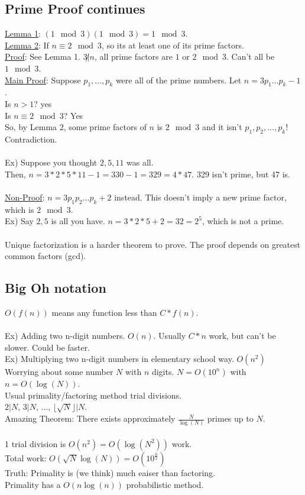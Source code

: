 \documentclass[13pt]{article}
\begin{document}
	\subsection*{Prime Proof continues}
	\underline{Lemma 1}: $(1 \mod 3)(1 \mod 3) = 1 \mod 3$.\\
	\underline{Lemma 2}: If $n \equiv 2 \mod 3$, so its at least one of its 
		prime factors.\\
	\underline{Proof}: See Lemma 1. $3 \not| n$, all prime factors are $1$ or
	$2 \mod 3$. Can't all be $1 \mod 3$.\\
	\underline{Main Proof}: Suppose $p_1, \ldots, p_k$ were all of the prime
	numbers. Let $n = 3p_1\ldots p_k - 1$.\\
	Is $n > 1$? yes \\
	Is $n \equiv 2 \mod 3$? Yes \\
	So, by Lemma 2, some prime factors of $n$ is $2 \mod 3$ and it isn't 
	$p_1, p_2, \ldots, p_k$! Contradiction.\\\\
%
	Ex) Suppose you thought $2, 5, 11$ was all. \\
		Then, $n = 3*2*5*11 - 1 = 330 - 1 = 329 = 4*47$. 329 isn't prime, but
		47 is.\\\\
	\underline{Non-Proof}: $n = 3p_1p_2\ldots p_k + 2$ instead. This doesn't
	imply a new prime factor, which is $2 \mod 3$. \\
	Ex) Say $2,5$  is all you have. $n = 3*2*5 + 2 = 32 = 2^5$, which is not
		a prime. \\\\
	Unique factorization is a harder theorem to prove. The proof depends on
	greatest common factors (gcd).

	\subsection*{Big Oh notation}
		$O(f(n))$ means any function less than $C * f(n)$. \\\\
		Ex) Adding two n-digit numbers. $O(n)$. Usually $C*n$ work, but can't
		be slower. Could be faster.\\
		Ex) Multiplying two n-digit numbers in elementary school way. $O(n^2)$\\
		Worrying about some number $N$ with $n$ digits. $N = O(10^n)$ with $n = 
		O(\log(N))$.\\
		Usual primality/factoring method trial divisions. \\
		$2 | N$, $3 | N$, $\ldots$, $\lfloor\sqrt{N}\rfloor | N$.\\
		Amazing Theorem: There exists approximately $\frac{N}{\log(N)}$ primes 
		up to $N$.\\\\
		1 trial division is $O(n^2) = O(\log(N^2))$ work. \\
		Total work: $O(\sqrt{N}\log(N)) = O(10^{\frac{n}{2}})$ \\
		Truth: Primality is (we think) much eaiser than factoring. \\
		Primality has a $O(n\log(n))$ probabilistic method. \\
\end{document}
